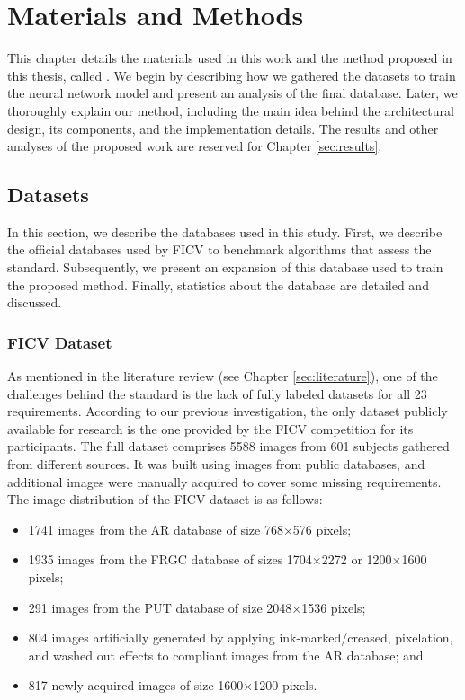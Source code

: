 \section{Materials and Methods} \label{sec:method}
 
This chapter details the materials used in this work and the method proposed in this thesis, called \methodname. We begin by describing how we gathered the datasets to train the neural network model and present an analysis of the final database. Later, we thoroughly explain our method, including the main idea behind the architectural design, its components, and the implementation details. The results and other analyses of the proposed work are reserved for Chapter \ref{sec:results}.
 
\subsection{Datasets}
 
In this section, we describe the databases used in this study. First, we describe the official databases used by FICV to benchmark algorithms that assess the \icao standard. Subsequently, we present an expansion of this database used to train the proposed method. Finally, statistics about the database are detailed and discussed.
 
\subsubsection{FICV Dataset} \label{sec:database}
 
As mentioned in the literature review (see Chapter \ref{sec:literature}), one of the challenges behind the \icao standard is the lack of fully labeled datasets for all 23 requirements. According to our previous investigation, the only dataset publicly available for research is the one provided by the FICV competition for its participants. The full dataset comprises 5588 images from 601 subjects gathered from different sources. It was built \adhoc using images from public databases, and additional images were manually acquired to cover some missing requirements. The image distribution of the FICV dataset is as follows:
 
\begin{itemize}
\item 1741 images from the AR database \citep{martinez1998ar} of size 768$\times$576 pixels;
\item 1935 images from the FRGC database \citep{databaseFRGC} of sizes 1704$\times$2272 or 1200$\times$1600 pixels;
\item 291 images from the PUT database \citep{kasinski2008put} of size 2048$\times$1536 pixels;
\item 804 images artificially generated by applying ink-marked/creased, pixelation, and washed out effects to compliant images from the AR database; and
\item 817 newly acquired images of size 1600$\times$1200 pixels.
\end{itemize}
 
